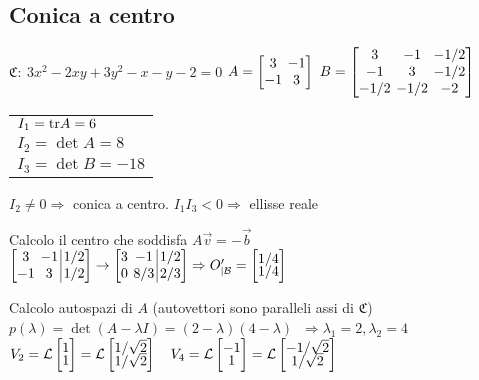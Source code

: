 \subsection{Conica a centro}
$\mathfrak{C}:\ 3x^2-2xy+3y^2-x-y-2=0$
$
A = \left[
	\arraycolsep=2.0pt\def\arraystretch{1.0}
	\begin{array}{@{}cc@{}}
		3  & -1 \\
		-1 & 3
	\end{array}
\right]
\
B = \left[
	\arraycolsep=2.0pt\def\arraystretch{1.0}
	\begin{array}{@{}ccc@{}}
		3  & -1 & -1/2 \\
		-1 & 3  & -1/2 \\
		-1/2  & -1/2 & -2 \\
	\end{array}
\right]
$
\begin{tabular}{l}
	$I_1 = \mathrm{tr} A = 6$ \\
	$I_2 = \det A = 8$ \\ 
	$I_3 = \det B = -18$
\end{tabular}

$I_2 \neq 0 \Rightarrow$ conica a centro. $I_1 I_3 < 0 \Rightarrow$ ellisse reale

Calcolo il centro che soddisfa $A \vec{v} = -\vec{b}$
$
\left[
	\arraycolsep=2.0pt\def\arraystretch{1.0}
	\begin{array}{@{}cc|c@{}}
		3  & -1 & 1/2 \\
		-1 & 3  & 1/2
	\end{array}
\right]
\rightarrow
\left[
	\arraycolsep=2.0pt\def\arraystretch{1.0}
	\begin{array}{@{}cc|c@{}}
		3  & -1   & 1/2 \\
		0  & 8/3  & 2/3 
	\end{array}
\right]
\Rightarrow
O'_{|\Base} =
\begin{bmatrix}
	1/4 \\[-0.3em]
	1/4 \\
\end{bmatrix}
$

Calcolo autospazi di $A$ (autovettori sono paralleli assi di $\mathfrak{C}$)
$p(\lambda) = \det(A-\lambda I) = (2-\lambda)(4-\lambda)$
$\ \Rightarrow \lambda_1 = 2, \lambda_2 = 4$
$V_2 = \mathcal{L} 
\begin{bmatrix}
	1 \\[-0.3em]
	1 \\
\end{bmatrix}
= \mathcal{L}
\begin{bmatrix}
	1/\sqrt{2} \\[-0.3em]
	1/\sqrt{2} \\
\end{bmatrix}
\quad
V_4 = \mathcal{L} 
\begin{bmatrix}
	-1 \\[-0.3em]
	1 \\
\end{bmatrix}
= \mathcal{L}
\begin{bmatrix}
	-1/\sqrt{2} \\[-0.3em]
	1/\sqrt{2} \\
\end{bmatrix}
$

